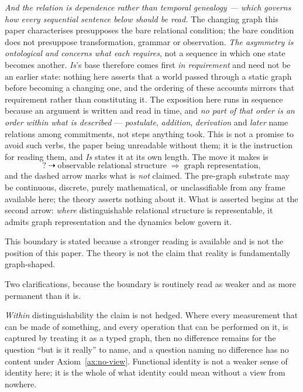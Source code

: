 \documentclass[11pt,a4paper]{article}
\theoremstyle{remark}\newtheorem{remark}[definition]{Remark}
\begin{document}
\emph{And the relation is dependence rather than temporal genealogy --- which governs how every
sequential sentence below should be read.} The changing graph this paper characterises presupposes the
bare relational condition; the bare condition does not presuppose transformation, grammar or
observation. \emph{The asymmetry is ontological and concerns what each requires}, not a sequence in
which one state becomes another. \emph{Is}'s base therefore comes first \emph{in requirement} and
need not be an earlier state: nothing here asserts that a world passed through a static graph before
becoming a changing one, and the ordering of these accounts mirrors that requirement rather than
constituting it. The exposition here runs in sequence because an argument is written and read in time, and
\emph{no part of that order is an order within what is described} --- \emph{postulate},
\emph{addition}, \emph{derivation} and \emph{later} name relations among commitments, not steps
anything took. This is not a promise to avoid such verbs, the paper being unreadable without them; it
is the instruction for reading them, and \emph{Is} states it at its own length. The move it makes is
\[
\boxed{?\;\dashrightarrow\;\text{observable relational structure}\;\Longrightarrow\;\text{graph representation},}
\]
and the dashed arrow marks what is \emph{not} claimed. The pre-graph substrate may be continuous, discrete, purely mathematical, or unclassifiable from any frame available here; the theory asserts nothing about it. What is asserted begins at the second arrow: \emph{where} distinguishable relational structure is representable, it admits graph representation and the dynamics below govern it.

This boundary is stated because a stronger reading is available and is not the position of this paper. The theory is not the claim that reality is fundamentally graph-shaped.

Two clarifications, because the boundary is routinely read as weaker and as more permanent than it is.

\emph{Within} distinguishability the claim is not hedged. Where every measurement that can be made of something, and every operation that can be performed on it, is captured by treating it as a typed graph, then no difference remains for the question ``but is it really'' to name, and a question naming no difference has no content under Axiom~\ref{ax:no-view}. Functional identity is not a weaker sense of identity here; it is the whole of what identity could mean without a view from nowhere.
\end{document}
